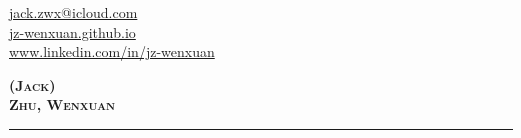 \documentclass[12pt,a4paper]{article}
\begin{document}
\hspace{-20pt}
\begin{minipage}{0.5\textwidth}
  \url{jack.zwx@icloud.com}\\
  \url{jz-wenxuan.github.io}\\
  \url{www.linkedin.com/in/jz-wenxuan}\\
\end{minipage}
\begin{minipage}{0.5\textwidth}
  \begin{flushright}
    \textbf{\textsc{
      \Large
      (Jack)\\
      \vspace{-7px}
      \Huge
      Zhu, Wenxuan\\
      \vspace{10px}
    }}
  \end{flushright}
\end{minipage}

\hspace{-20pt}
\rule{\textwidth}{1pt}\\
\end{document}
